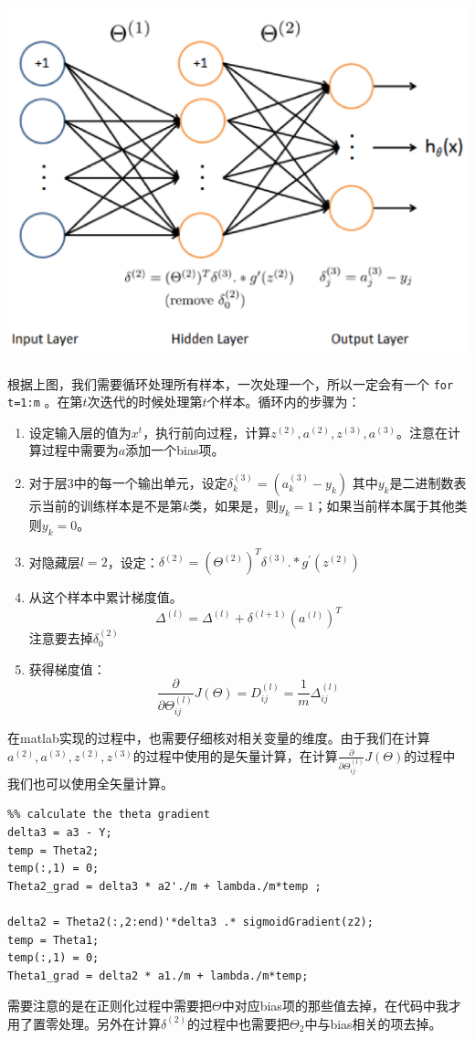 \documentclass[10pt,a4paper,UTF8]{article}
\begin{document}
\begin{center}
\includegraphics[width=.9\linewidth]{../../img/computer_ng/20171014BPimplement.png}
\end{center}

根据上图，我们需要循环处理所有样本，一次处理一个，所以一定会有一个 \texttt{for t=1:m} 。在第\(t\)次迭代的时候处理第\(t\)个样本。循环内的步骤为：

\begin{enumerate}
\item 设定输入层的值为\(x^{t}\)，执行前向过程，计算\(z^{(2)},a^{(2)},z^{(3)},a^{(3)}\)。注意在计算过程中需要为\(a\)添加一个bias项。
\item 对于层3中的每一个输出单元，设定\(\delta_{k}^{(3)} = ( a_{k}^{(3)} - y_{k})\) 其中\(y_{k}\)是二进制数表示当前的训练样本是不是第\(k\)类，如果是，则\(y_{k} = 1\)；如果当前样本属于其他类则\(y_{k}=0\)。
\item 对隐藏层\(l=2\)，设定：\(\delta^{(2)} = (\Theta^{(2)})^{T}\delta^{(3)}.*g^{'}(z^{(2)})\)
\item 从这个样本中累计梯度值。\[ \Delta^{(l)} = \Delta^{(l)} +\delta^{(l+1)}(a^{(l)})^{T} \] 注意要去掉\(\delta_{0}^{(2)}\)
\item 获得梯度值：\[\frac{\partial}{\partial \Theta_{ij}^{(l)}}J(\Theta) = D_{ij}^{(l)} = \frac{1}{m}\Delta_{ij}^{(l)}\]
\end{enumerate}

在matlab实现的过程中，也需要仔细核对相关变量的维度。由于我们在计算\(a^{(2)},a^{(3)},z^{(2)},z^{(3)}\)的过程中使用的是矢量计算，在计算\(\frac{\partial}{\partial \Theta_{ij}^{(l)}} J(\Theta)\)的过程中我们也可以使用全矢量计算。
\lstset{language=matlab,label= ,caption= ,captionpos=b,numbers=none}
\begin{lstlisting}
%% calculate the theta gradient
delta3 = a3 - Y;
temp = Theta2;
temp(:,1) = 0;
Theta2_grad = delta3 * a2'./m + lambda./m*temp ;

delta2 = Theta2(:,2:end)'*delta3 .* sigmoidGradient(z2);
temp = Theta1;
temp(:,1) = 0;
Theta1_grad = delta2 * a1./m + lambda./m*temp;
\end{lstlisting}
需要注意的是在正则化过程中需要把\(\Theta\)中对应bias项的那些值去掉，在代码中我才用了置零处理。另外在计算\(\delta^{(2)}\)的过程中也需要把\(\Theta_{2}\)中与bias相关的项去掉。
\end{document}
